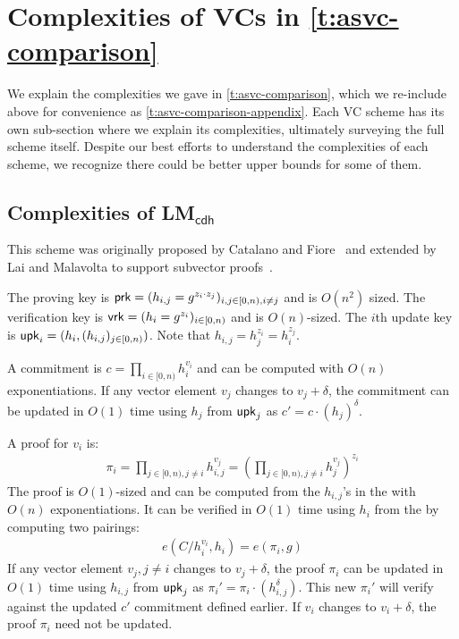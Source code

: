 \section{Complexities of VCs in \cref{t:asvc-comparison}}
\label{s:complexity:kog}


We explain the complexities we gave in \cref{t:asvc-comparison}, which we re-include above for convenience as \cref{t:asvc-comparison-appendix}.
Each VC scheme has its own sub-section where we explain its complexities, ultimately surveying the full scheme itself.
Despite our best efforts to understand the complexities of each scheme, we recognize there could be better upper bounds for some of them.

\subsection{Complexities of LM$_\mathsf{cdh}$~\cite{LM19}}

This scheme was originally proposed by Catalano and Fiore~\cite{CF13} and extended by Lai and Malavolta to support subvector proofs~\cite{LM19}.

The proving key is $\mathsf{prk}=(h_{i,j}=g^{z_i \cdot z_j})_{i,j\in [0,n),i\ne j}$ and is $O(n^2)$ sized.
The verification key is $\mathsf{vrk}=(h_{i}=g^{z_i})_{i\in [0,n)}$ and is $O(n)$-sized.
The $i$th update key is $\mathsf{upk}_i = (h_i, (h_{i,j})_{j\in [0,n)})$.
Note that $h_{i,j} = h_j^{z_i} = h_i^{z_j}$.

A commitment is $c=\prod_{i\in [0,n)} h_i^{v_i}$ and can be computed with $O(n)$ exponentiations.
If any vector element $v_j$ changes to $v_j + \delta$, the commitment can be updated in $O(1)$ time using $h_j$ from $\mathsf{upk}_j$ as $c' = c \cdot (h_j)^{\delta}$.

A proof for $v_i$ is:
\begin{align}
\pi_i = \prod_{j\in [0,n),j \ne i} h_{i,j}^{v_j}=\left(\prod_{j\in [0,n),j \ne i} h_{j}^{v_j}\right)^{z_i}
\end{align}
The proof is $O(1)$-sized and can be computed from the $h_{i,j}$'s in the \prk with $O(n)$ exponentiations.
It can be verified in $O(1)$ time using $h_i$ from the \vrk by computing two pairings:
\begin{align}
e(C/h_i^{v_i}, h_i) = e(\pi_i, g)
\end{align}
If any vector element $v_j,j\ne i$ changes to $v_j + \delta$, the proof $\pi_i$ can be updated in $O(1)$ time using $h_{i,j}$ from $\mathsf{upk}_j$ as $\pi_i' = \pi_i \cdot \left(h_{i,j}^{\delta}\right)$.
This new $\pi_i'$ will verify against the updated $c'$ commitment defined earlier.
If $v_i$ changes to $v_i + \delta$, the proof $\pi_i$ need not be updated.

